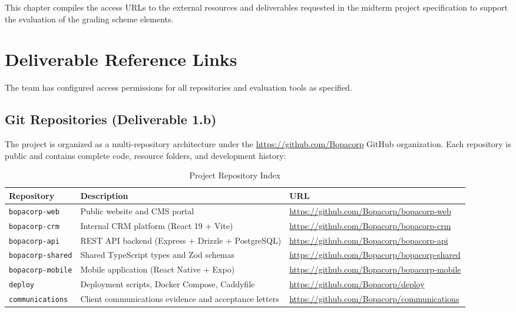\documentclass[letterpaper%
, oneside%
, 12pt%
, memoireprojet%
, english%
,creativecommons,hyperref, withAlgo2e %
]{thETS}
\begin{document}
This chapter compiles the access URLs to the external resources and deliverables requested in the midterm project specification to support the evaluation of the grading scheme elements.

\section{Deliverable Reference Links}
The team has configured access permissions for all repositories and evaluation tools as specified.

\subsection{Git Repositories (Deliverable 1.b)}
The project is organized as a multi-repository architecture under the \url{https://github.com/Bopacorp} GitHub organization. Each repository is public and contains complete code, resource folders, and development history:

\begin{table}[H]
\centering
\begin{tabular}{|p{3.5cm}|p{6.5cm}|p{4cm}|}
\hline
\textbf{Repository} & \textbf{Description} & \textbf{URL} \\ \hline
\texttt{bopacorp-web} & Public website and CMS portal & \url{https://github.com/Bopacorp/bopacorp-web} \\ \hline
\texttt{bopacorp-crm} & Internal CRM platform (React 19 + Vite) & \url{https://github.com/Bopacorp/bopacorp-crm} \\ \hline
\texttt{bopacorp-api} & REST API backend (Express + Drizzle + PostgreSQL) & \url{https://github.com/Bopacorp/bopacorp-api} \\ \hline
\texttt{bopacorp-shared} & Shared TypeScript types and Zod schemas & \url{https://github.com/Bopacorp/bopacorp-shared} \\ \hline
\texttt{bopacorp-mobile} & Mobile application (React Native + Expo) & \url{https://github.com/Bopacorp/bopacorp-mobile} \\ \hline
\texttt{deploy} & Deployment scripts, Docker Compose, Caddyfile & \url{https://github.com/Bopacorp/deploy} \\ \hline
\texttt{communications} & Client communications evidence and acceptance letters & \url{https://github.com/Bopacorp/communications} \\ \hline
\end{tabular}
\caption{Project Repository Index}
\label{tab:repo_index}
\end{table}
\end{document}
